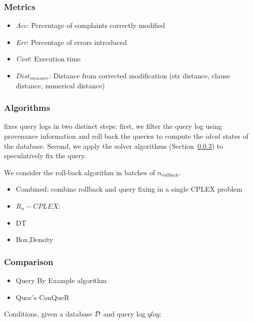 \subsubsection{Metrics}

\begin{itemize}
\item {\it Acc}: Percentage of complaints correctly modified
\item {\it Err}: Percentage of errors introduced
\item {\it Cost}: Execution time
\item {\it $Dist_{measure}$}: Distance from corrected modification  
      (str distance, clause distance, numerical distance)
\end{itemize}

\subsubsection{Algorithms}

\sys fixes query logs in two distinct steps: first, we filter the query log using 
provenance information and roll back the queries to compute the $ideal$ states of the database.
Second, we apply the solver algorithms (Section~\ref{}) to speculatively fix the query.

We consider the roll-back algorithm in batches of $n_{rollback}$.

\begin{itemize}
\item Combined:  combine rollback and query fixing in a single CPLEX problem
\item $R_n-CPLEX$: 
\item DT
\item Box,Density
\end{itemize}



\subsubsection{Comparison}

\begin{itemize}
\item Query By Example algorithm
\item Quoc's ConQueR
\end{itemize}

Conditions, given a database ${\cal D}$ and query log $qlog$:

